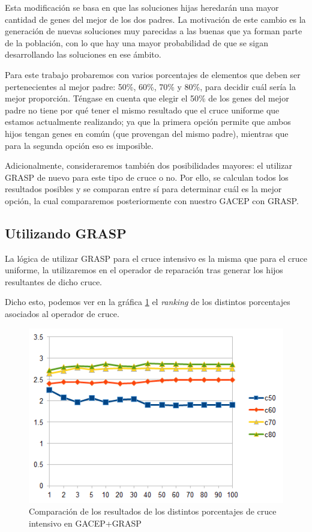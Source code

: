 Esta modificación se basa en que las soluciones hijas heredarán una mayor cantidad de genes del mejor de los dos padres. 
La motivación de este cambio es la generación de nuevas soluciones muy parecidas a las buenas que ya forman parte de la población, con lo que hay una mayor probabilidad de que se sigan desarrollando las soluciones en ese ámbito. 

Para este trabajo probaremos con varios porcentajes de elementos que deben ser pertenecientes al mejor padre: 50\%, 60\%, 70\% y 80\%, para decidir cuál sería la mejor proporción. 
Téngase en cuenta que elegir el 50\% de los genes del mejor padre no tiene por qué tener el mismo resultado que el cruce uniforme que estamos actualmente realizando; ya que la primera opción permite que ambos hijos tengan genes en común (que provengan del mismo padre), mientras que para la segunda opción eso es imposible. 

Adicionalmente, consideraremos también dos posibilidades mayores: el utilizar GRASP de nuevo para este tipo de cruce o no. 
Por ello, se calculan todos los resultados posibles y se comparan entre sí para determinar cuál es la mejor opción, la cual compararemos posteriormente con nuestro GACEP con GRASP.

\subsection{Utilizando GRASP}

La lógica de utilizar GRASP para el cruce intensivo es la misma que para el cruce uniforme, la utilizaremos en el operador de reparación tras generar los hijos resultantes de dicho cruce. 

Dicho esto, podemos ver en la gráfica \ref{fig:GACEPcGRASP} el \textit{ranking} de los distintos porcentajes asociados al operador de cruce.

\begin{figure}[h]
		\centering
		\includegraphics[scale=1]{imagenes/Experimental/GACEPcGRASP.png}
        \caption{Comparación de los resultados de los distintos porcentajes de cruce intensivo en GACEP+GRASP}
        \label{fig:GACEPcGRASP}
\end{figure}

